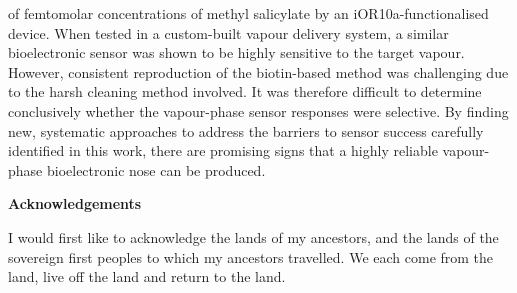 \documentclass[
  a4paper,
]{scrbook}
\begin{document}
\begin{spacing}{1.2}
\fancyhf{} %
\thispagestyle{fancy} %
\renewcommand{\headrulewidth}{0pt}
\fancyfoot[L]{\thepage} %
of femtomolar concentrations of methyl salicylate by an iOR10a-functionalised device. When tested in a custom-built vapour delivery system, a similar bioelectronic sensor was shown to be highly sensitive to the target vapour. However, consistent reproduction of the biotin-based method was challenging due to the harsh cleaning method involved. It was therefore difficult to determine conclusively whether the vapour-phase sensor responses were selective. By finding new, systematic approaches to address the barriers to sensor success carefully identified in this work, there are promising signs that a highly reliable vapour-phase bioelectronic nose can be produced.

\clearpage
\newpage


\thispagestyle{plain}

\begin{flushleft}
\huge\textbf{Acknowledgements}
\end{flushleft}

\vspace*{\baselineskip}

I would first like to acknowledge the lands of my ancestors, and the lands of the sovereign first peoples to which my ancestors travelled. We each come from the land, live off the land and return to the land.
\end{spacing}
\end{document}
